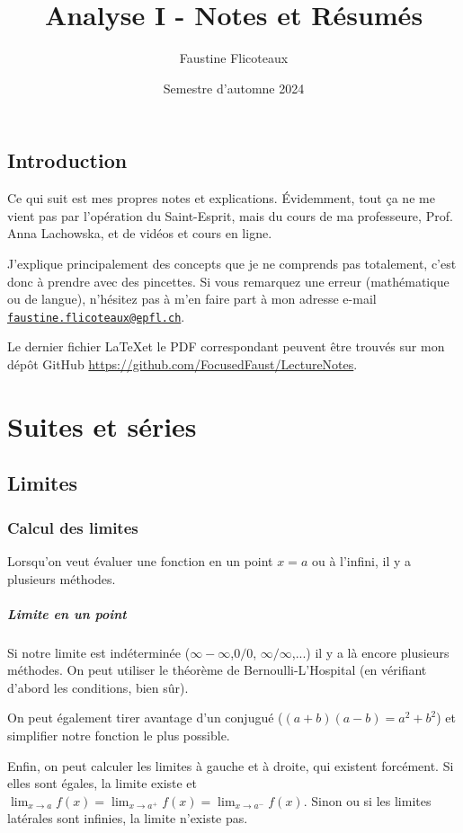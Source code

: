 \documentclass[10pt,a4paper]{book}
\title{Analyse I - Notes et Résumés}
\author{Faustine Flicoteaux}
\date{Semestre d'automne 2024}
\begin{document}
\maketitle
\tableofcontents
\newpage


\section*{Introduction}
Ce qui suit est mes propres notes et explications. Évidemment, tout ça ne me vient pas par l'opération du Saint-Esprit, mais du cours de ma professeure, Prof. Anna Lachowska, et de vidéos et cours en ligne.\par 
J'explique principalement des concepts que je ne comprends pas totalement, c'est donc à prendre avec des pincettes. Si vous remarquez une erreur (mathématique ou de langue), n'hésitez pas à m'en faire part à mon adresse e-mail \texttt{\href{mailto:faustine.flicoteaux@epfl.ch}{faustine.flicoteaux@epfl.ch}}.\par 
Le dernier fichier \LaTeX et le PDF correspondant peuvent être trouvés sur mon dépôt GitHub \url{https://github.com/FocusedFaust/LectureNotes}.

\chapter{Suites et séries}
\section{Limites}
\subsection{Calcul des limites}
Lorsqu'on veut évaluer une fonction en un point $x=a$ ou à l'infini, il y a plusieurs méthodes.
\paragraph{Limite en un point} 
Si notre limite est indéterminée ($\infty -\infty$,$0/0$, $\infty/\infty$,...) il y a là encore plusieurs méthodes. On peut utiliser le théorème de Bernoulli-L'Hospital (en vérifiant d'abord les conditions, bien sûr).\par 
On peut également tirer avantage d'un conjugué ($(a+b)(a-b)=a^2+b^2$) et simplifier notre fonction le plus possible.\par 
Enfin, on peut calculer les limites à gauche et à droite, qui existent forcément. Si elles sont égales, la limite existe et $\lim_{x\to a}f(x) = \lim_{x\to a^+}f(x) = \lim_{x\to a^-}f(x)$. Sinon ou si les limites latérales sont infinies, la limite n'existe pas.
\end{document}
